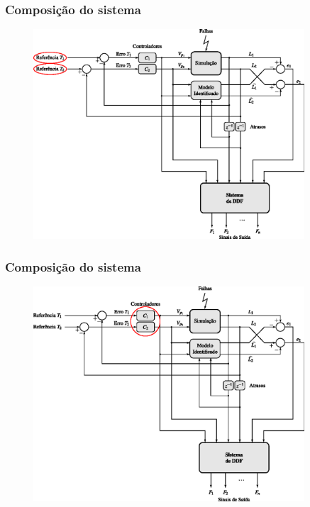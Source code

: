 \documentclass{beamer}
\begin{document}
\begin{frame}
    \frametitle{Composição do sistema}

\begin{figure}[htb]
\centering
    \includegraphics[width=0.9\textwidth]{imgs/sistema/eps/composicao_mod_1}
\end{figure}
\end{frame}

\begin{frame}
    \frametitle{Composição do sistema}

\begin{figure}[htb]
\centering
    \includegraphics[width=0.9\textwidth]{imgs/sistema/eps/composicao_mod_2}
\end{figure}
\end{frame}
\end{document}

